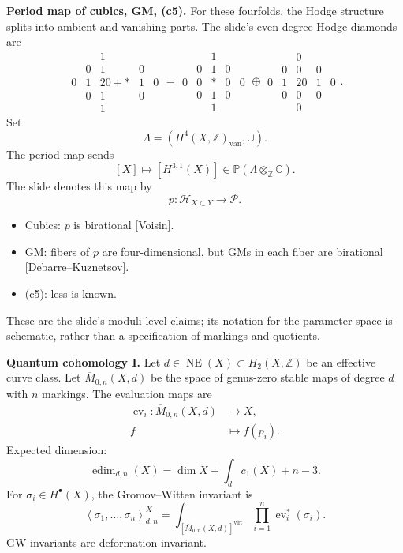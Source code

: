 \medskip\noindent
\textbf{Period map of cubics, GM, (c5).}
For these fourfolds, the Hodge structure
splits into ambient and vanishing parts.
The slide's even-degree Hodge diamonds are
$$
\begin{array}{ccccc}
&&1&&\\
&0&1&0&\\
0&1&20+*&1&0\\
&0&1&0&\\
&&1&&
\end{array}
=
\begin{array}{ccccc}
&&1&&\\
&0&1&0&\\
0&0&*&0&0\\
&0&1&0&\\
&&1&&
\end{array}
\oplus
\begin{array}{ccccc}
&&0&&\\
&0&0&0&\\
0&1&20&1&0\\
&0&0&0&\\
&&0&&
\end{array}.
$$
Set
$$
\Lambda=(H^4(X,\mathbb Z)_{\mathrm{van}},
\cup).
$$
The period map sends
$$
[X]\longmapsto[H^{3,1}(X)]
\in\mathbb P(\Lambda\otimes_{\mathbb Z}
\mathbb C).
$$
The slide denotes this map by
$$
p:\mathcal H_{X\subset Y}
\longrightarrow\mathcal P.
$$
\begin{itemize}
\item Cubics: $p$ is birational [Voisin].
\item GM: fibers of $p$ are four-dimensional,
but GMs in each fiber are birational
[Debarre--Kuznetsov].
\item (c5): less is known.
\end{itemize}
These are the slide's moduli-level claims;
its notation for the parameter space is
schematic, rather than a specification of
markings and quotients.

\medskip\noindent
\textbf{Quantum cohomology I.}
Let $d\in\operatorname{NE}(X)
\subset H_2(X,\mathbb Z)$ be an effective
curve class. Let $\overline M_{0,n}(X,d)$
be the space of genus-zero stable maps of
degree $d$ with $n$ markings.
The evaluation maps are
$$
\begin{aligned}
\operatorname{ev}_i:
\overline M_{0,n}(X,d)&\longrightarrow X,\\
f&\longmapsto f(p_i).
\end{aligned}
$$
Expected dimension:
$$
\operatorname{edim}_{d,n}(X)
=\dim X+\int_d c_1(X)+n-3.
$$
For $\sigma_i\in H^\bullet(X)$, the
Gromov--Witten invariant is
$$
\left\langle\sigma_1,\ldots,\sigma_n
\right\rangle^X_{d,n}
=
\int_{[\overline M_{0,n}(X,d)]
^{\mathrm{virt}}}
\prod_{i=1}^n\operatorname{ev}_i^*(\sigma_i).
$$
GW invariants are deformation invariant.

